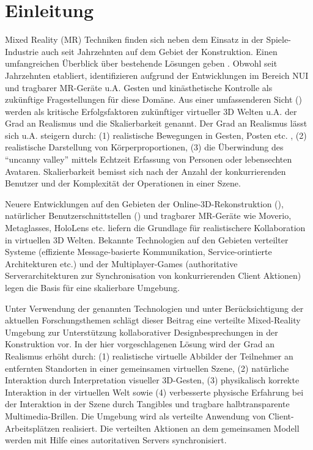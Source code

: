 \section{Einleitung}

Mixed Reality (MR) Techniken finden sich neben dem Einsatz in der Spiele-Industrie auch seit Jahrzehnten auf dem Gebiet der Konstruktion. Einen umfangreichen Überblick über bestehende Lösungen geben \cite{Rankohi:2013}. Obwohl seit Jahrzehnten etabliert, identifizieren \cite{Chi2013} aufgrund der Entwicklungen im Bereich NUI und tragbarer MR-Geräte u.A. Gesten und kinästhetische Kontrolle als zukünftige Fragestellungen für diese Domäne. Aus einer umfassenderen Sicht (\cite{Dionisio:2013:VWM:2480741.2480751}) werden als kritische Erfolgsfaktoren zukünftiger virtueller 3D  Welten u.A. der Grad an Realismus und die Skalierbarkeit genannt. Der Grad an Realismus lässt sich u.A. steigern durch: (1) realistische Bewegungen in Gesten, Posten etc. , (2) realistische Darstellung von Körperproportionen, (3) die Überwindung des "`uncanny valley"' mittels Echtzeit Erfassung von Personen oder lebensechten Avataren. Skalierbarkeit bemisst sich nach der Anzahl der konkurrierenden Benutzer und der Komplexität der Operationen in einer Szene. 

Neuere Entwicklungen auf den Gebieten der Online-3D-Rekonstruktion (\cite{mekuria2013teleimmersion}), natürlicher Benutzerschnittstellen (\cite{Zhao:2013:OHG:2502081.2502103}) und tragbarer MR-Geräte wie Moverio, Metaglasses, HoloLens etc. liefern die Grundlage für realistischere Kollaboration in virtuellen 3D Welten. 
Bekannte Technologien auf den Gebieten verteilter Systeme (effiziente Message-basierte Kommunikation, Service-orintierte Architekturen etc.) und der Multiplayer-Games (authoritative Serverarchitekturen zur Synchronisation von konkurrierenden Client Aktionen) legen die Basis für eine skalierbare Umgebung. 

Unter Verwendung der genannten Technologien und unter Berücksichtigung der aktuellen Forschungsthemen schlägt dieser Beitrag eine verteilte Mixed-Reality Umgebung zur Unterstützung kollaborativer Designbesprechungen in der Konstruktion vor. In der hier vorgeschlagenen Lösung wird der Grad an Realismus erhöht durch: (1) realistische virtuelle Abbilder der Teilnehmer an entfernten Standorten in einer gemeinsamen virtuellen Szene, (2)  natürliche Interaktion durch Interpretation visueller 3D-Gesten, (3) physikalisch korrekte Interaktion in der virtuellen Welt sowie (4) verbesserte physische Erfahrung bei der Interaktion in der Szene durch Tangibles  und tragbare halbtransparente Multimedia-Brillen.  Die Umgebung wird als verteilte Anwendung von Client-Arbeitsplätzen realisiert. Die verteilten Aktionen an dem gemeinsamen Modell werden mit Hilfe eines autoritativen Servers synchronisiert.
 

